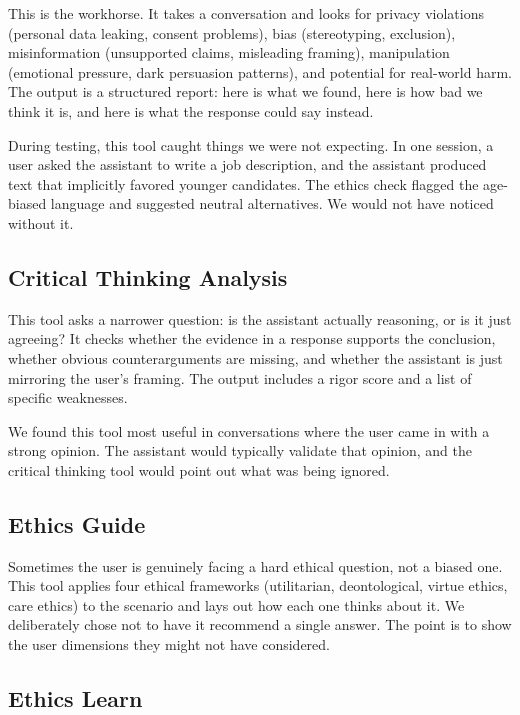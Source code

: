 \documentclass[conference]{IEEEtran}
\begin{document}
This is the workhorse. It takes a conversation and looks for privacy violations (personal data leaking, consent problems), bias (stereotyping, exclusion), misinformation (unsupported claims, misleading framing), manipulation (emotional pressure, dark persuasion patterns), and potential for real-world harm. The output is a structured report: here is what we found, here is how bad we think it is, and here is what the response could say instead.

During testing, this tool caught things we were not expecting. In one session, a user asked the assistant to write a job description, and the assistant produced text that implicitly favored younger candidates. The ethics check flagged the age-biased language and suggested neutral alternatives. We would not have noticed without it.

\subsection{Critical Thinking Analysis}

This tool asks a narrower question: is the assistant actually reasoning, or is it just agreeing? It checks whether the evidence in a response supports the conclusion, whether obvious counterarguments are missing, and whether the assistant is just mirroring the user's framing. The output includes a rigor score and a list of specific weaknesses.

We found this tool most useful in conversations where the user came in with a strong opinion. The assistant would typically validate that opinion, and the critical thinking tool would point out what was being ignored.

\subsection{Ethics Guide}

Sometimes the user is genuinely facing a hard ethical question, not a biased one. This tool applies four ethical frameworks (utilitarian, deontological, virtue ethics, care ethics) to the scenario and lays out how each one thinks about it. We deliberately chose not to have it recommend a single answer. The point is to show the user dimensions they might not have considered.

\subsection{Ethics Learn}
\end{document}

